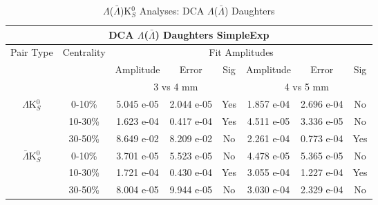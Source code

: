 \documentclass[../AnalysisNoteJBuxton.tex]{subfiles}
\begin{document}
\begin{table}
 \centering
 \begin{tabular}{|c|c|c|c|c||c|c|c|}
  \multicolumn{8}{c}{DCA $\Lambda$($\bar{\Lambda}$) Daughters SimpleExp} \\
  \hline
  \multirow{3}{*}{Pair Type} & \multirow{3}{*}{Centrality} & \multicolumn{6}{c|}{Fit Amplitudes} \\
  \cline{3-8}
   & & Amplitude & Error & Sig & Amplitude & Error & Sig \\  
  \cline{3-8}
   & & \multicolumn{3}{c||}{3 vs 4 mm} & \multicolumn{3}{c|}{4 vs 5 mm} \\  
  \hline  
  \multirow{3}{*}{$\Lambda$K$^{0}_{S}$}  
   &  0-10\% & 5.045 e-05 & 2.044 e-05 & Yes & 1.857 e-04 & 2.696 e-04 & No \\
   & 10-30\% & 1.623 e-04 & 0.417 e-04 & Yes & 4.511 e-05 & 3.336 e-05 & No \\
   & 30-50\% & 8.649 e-02 & 8.209 e-02 & No & 2.261 e-04 & 0.773 e-04 & Yes \\
  \hline  
  \multirow{3}{*}{$\bar{\Lambda}$K$^{0}_{S}$}  
   &  0-10\% & 3.701 e-05 & 5.523 e-05 & No & 4.478 e-05 & 5.365 e-05 & No \\
   & 10-30\% & 1.721 e-04 & 0.430 e-04 & Yes & 3.055 e-04 & 1.227 e-04 & Yes \\
   & 30-50\% & 8.004 e-05 & 9.944 e-05 & No & 3.030 e-04 & 2.329 e-04 & No \\
  \hline
 \end{tabular}
 \caption{$\Lambda$($\bar{\Lambda}$)K$^{0}_{S}$ Analyses: DCA $\Lambda$($\bar{\Lambda}$) Daughters}
 \label{tab:LamDaughtersDcaLamK0_SimpleExp}
\end{table}
\end{document}
